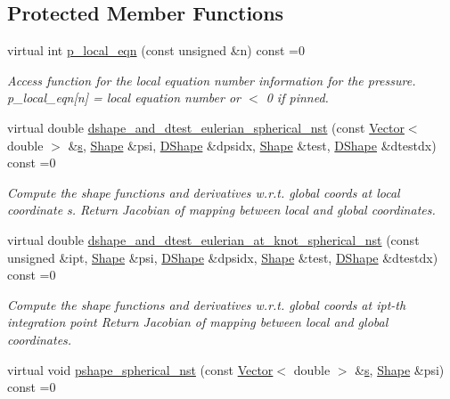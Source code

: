\subsection*{Protected Member Functions}
\begin{DoxyCompactItemize}
\item 
virtual int \hyperlink{classoomph_1_1SphericalNavierStokesEquations_ad8d9a0edbe3793a008a6bff670c26643}{p\+\_\+local\+\_\+eqn} (const unsigned \&n) const =0
\begin{DoxyCompactList}\small\item\em Access function for the local equation number information for the pressure. p\+\_\+local\+\_\+eqn\mbox{[}n\mbox{]} = local equation number or $<$ 0 if pinned. \end{DoxyCompactList}\item 
virtual double \hyperlink{classoomph_1_1SphericalNavierStokesEquations_a3b9e9cf2d59dffcf278b4c9f73be6d62}{dshape\+\_\+and\+\_\+dtest\+\_\+eulerian\+\_\+spherical\+\_\+nst} (const \hyperlink{classoomph_1_1Vector}{Vector}$<$ double $>$ \&\hyperlink{cfortran_8h_ab7123126e4885ef647dd9c6e3807a21c}{s}, \hyperlink{classoomph_1_1Shape}{Shape} \&psi, \hyperlink{classoomph_1_1DShape}{D\+Shape} \&dpsidx, \hyperlink{classoomph_1_1Shape}{Shape} \&test, \hyperlink{classoomph_1_1DShape}{D\+Shape} \&dtestdx) const =0
\begin{DoxyCompactList}\small\item\em Compute the shape functions and derivatives w.\+r.\+t. global coords at local coordinate s. Return Jacobian of mapping between local and global coordinates. \end{DoxyCompactList}\item 
virtual double \hyperlink{classoomph_1_1SphericalNavierStokesEquations_a10ed6f34245f5b31095ae636fc08749a}{dshape\+\_\+and\+\_\+dtest\+\_\+eulerian\+\_\+at\+\_\+knot\+\_\+spherical\+\_\+nst} (const unsigned \&ipt, \hyperlink{classoomph_1_1Shape}{Shape} \&psi, \hyperlink{classoomph_1_1DShape}{D\+Shape} \&dpsidx, \hyperlink{classoomph_1_1Shape}{Shape} \&test, \hyperlink{classoomph_1_1DShape}{D\+Shape} \&dtestdx) const =0
\begin{DoxyCompactList}\small\item\em Compute the shape functions and derivatives w.\+r.\+t. global coords at ipt-\/th integration point Return Jacobian of mapping between local and global coordinates. \end{DoxyCompactList}\item 
virtual void \hyperlink{classoomph_1_1SphericalNavierStokesEquations_a17799ec1f3a1d8bbeee1d357bba0a249}{pshape\+\_\+spherical\+\_\+nst} (const \hyperlink{classoomph_1_1Vector}{Vector}$<$ double $>$ \&\hyperlink{cfortran_8h_ab7123126e4885ef647dd9c6e3807a21c}{s}, \hyperlink{classoomph_1_1Shape}{Shape} \&psi) const =0

\end{DoxyCompactItemize}
